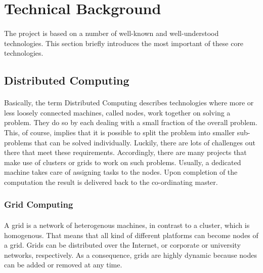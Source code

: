 \section{Technical Background}
\paragraph{}
The project is based on a number of well-known and well-understood technologies. This section briefly introduces the most important of these core technologies.

\subsection{Distributed Computing}
\paragraph{}
Basically, the term Distributed Computing describes technologies where more or less loosely connected machines, called nodes, work together on solving a problem. They do so by each dealing with a small fraction of the overall problem. This, of course, implies that it is possible to split the problem into smaller sub-problems that can be solved individually. Luckily, there are lots of challenges out there that meet these requirements. Accordingly, there are many projects that make use of clusters or grids to work on such problems. Usually, a dedicated machine takes care of assigning tasks to the nodes. Upon completion of the computation the result is delivered back to the co-ordinating master.


\subsubsection{Grid Computing}
\paragraph{}
A grid is a network of heterogenous machines, in contrast to a cluster, which is homogenous. That means that all kind of different platforms can become nodes of a grid. Grids can be distributed over the Internet, or corporate or university networks, respectively. As a consequence, grids are highly dynamic because nodes can be added or removed at any time.

